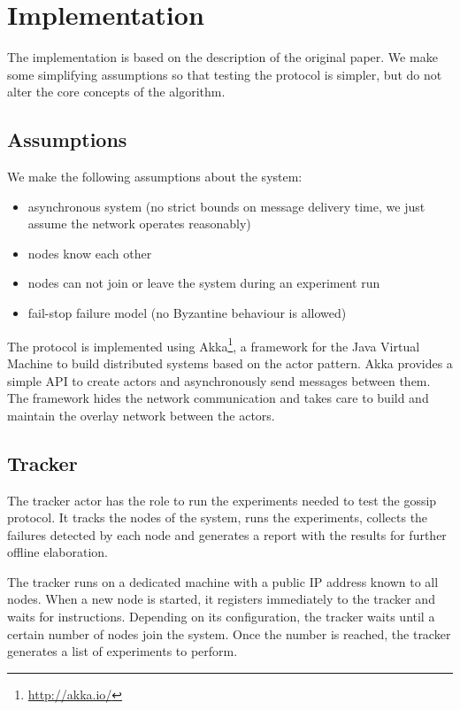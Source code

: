 \section{Implementation}
\label{sec:implementation}

The implementation is based on the description of the original paper.
We make some simplifying assumptions so that testing the protocol is simpler, but do not alter the core concepts of the algorithm.

\subsection{Assumptions}

We make the following assumptions about the system:
\begin{itemize}
    \item asynchronous system (no strict bounds on message delivery time, we just assume the network operates reasonably)
    \item nodes know each other
    \item nodes can not join or leave the system during an experiment run
    \item fail-stop failure model (no Byzantine behaviour is allowed)
\end{itemize}

The protocol is implemented using Akka\footnote{\url{http://akka.io/}}, a framework for the Java Virtual Machine to build distributed systems based on the actor pattern.
Akka provides a simple API to create actors and asynchronously send messages between them.
The framework hides the network communication and takes care to build and maintain the overlay network between the actors.

\subsection{Tracker}
The tracker actor has the role to run the experiments needed to test the gossip protocol.
It tracks the nodes of the system, runs the experiments, collects the failures detected by each node and generates a report with the results for further offline elaboration.

The tracker runs on a dedicated machine with a public IP address known to all nodes.
When a new node is started, it registers immediately to the tracker and waits for instructions.
Depending on its configuration, the tracker waits until a certain number of nodes join the system.
Once the number is reached, the tracker generates a list of experiments to perform.

